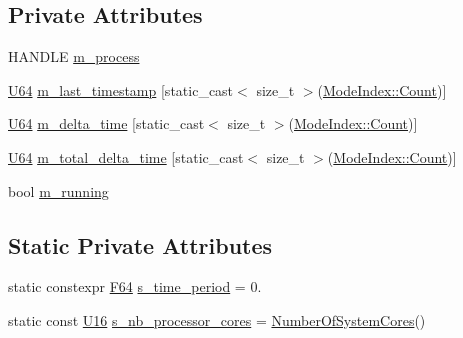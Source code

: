 \subsection*{Private Attributes}
\begin{DoxyCompactItemize}
\item 
H\+A\+N\+D\+LE \hyperlink{classmage_1_1_c_p_u_timer_ac99b24abe1fe0753b18cfa39b298a876}{m\+\_\+process}
\item 
\hyperlink{namespacemage_a6672cf3c861707ce4a3235a3eb43941d}{U64} \hyperlink{classmage_1_1_c_p_u_timer_a14b5ef7beba6c33769ac66ef171d0f0b}{m\+\_\+last\+\_\+timestamp} \mbox{[}static\+\_\+cast$<$ size\+\_\+t $>$(\hyperlink{classmage_1_1_c_p_u_timer_a220f69be8f304f6fad61ccb358d278faae93f994f01c537c4e2f7d8528c3eb5e9}{Mode\+Index\+::\+Count})\mbox{]}
\item 
\hyperlink{namespacemage_a6672cf3c861707ce4a3235a3eb43941d}{U64} \hyperlink{classmage_1_1_c_p_u_timer_a2ce9eda81a57934b172b426238d4587d}{m\+\_\+delta\+\_\+time} \mbox{[}static\+\_\+cast$<$ size\+\_\+t $>$(\hyperlink{classmage_1_1_c_p_u_timer_a220f69be8f304f6fad61ccb358d278faae93f994f01c537c4e2f7d8528c3eb5e9}{Mode\+Index\+::\+Count})\mbox{]}
\item 
\hyperlink{namespacemage_a6672cf3c861707ce4a3235a3eb43941d}{U64} \hyperlink{classmage_1_1_c_p_u_timer_a1c6d043eb08b1689d0f52dbd886fa9d4}{m\+\_\+total\+\_\+delta\+\_\+time} \mbox{[}static\+\_\+cast$<$ size\+\_\+t $>$(\hyperlink{classmage_1_1_c_p_u_timer_a220f69be8f304f6fad61ccb358d278faae93f994f01c537c4e2f7d8528c3eb5e9}{Mode\+Index\+::\+Count})\mbox{]}
\item 
bool \hyperlink{classmage_1_1_c_p_u_timer_a7190afa453085b7bbd7cb76ff6bb62f2}{m\+\_\+running}
\end{DoxyCompactItemize}
\subsection*{Static Private Attributes}
\begin{DoxyCompactItemize}
\item 
static constexpr \hyperlink{namespacemage_ad26233bbec640deda836e572c1a23708}{F64} \hyperlink{classmage_1_1_c_p_u_timer_af7371eff8de8b5f667769ec71a69e9cf}{s\+\_\+time\+\_\+period} = 0.
\item 
static const \hyperlink{namespacemage_af69057eec1ce005c1c3b34ae33486f16}{U16} \hyperlink{classmage_1_1_c_p_u_timer_a49e518f172efcc1e43baef65bb5ab3a7}{s\+\_\+nb\+\_\+processor\+\_\+cores} = \hyperlink{namespacemage_a825ee5d6ce6db3c24967af86ed40edd4}{Number\+Of\+System\+Cores}()
\end{DoxyCompactItemize}



